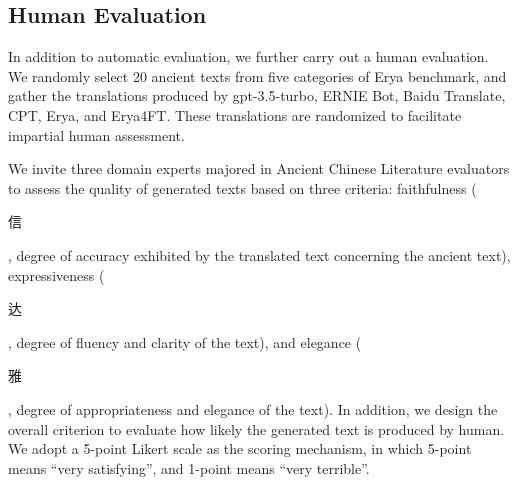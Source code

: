 


\subsection{Human Evaluation}
In addition to automatic evaluation, we further carry out a human evaluation. We randomly select 20 ancient texts from five categories of Erya benchmark, and gather the translations produced by gpt-3.5-turbo, ERNIE Bot, Baidu Translate, CPT, Erya, and Erya4FT. These translations are randomized to facilitate impartial human assessment.

We invite three domain experts majored in Ancient Chinese Literature evaluators to assess the quality of generated texts based on three criteria: faithfulness (\begin{CJK*}{UTF8}{gbsn}信\end{CJK*}, degree of accuracy exhibited by the translated text concerning the ancient text), expressiveness (\begin{CJK*}{UTF8}{gbsn}达\end{CJK*}, degree of fluency and clarity of the text), and elegance (\begin{CJK*}{UTF8}{gbsn}雅\end{CJK*}, degree of appropriateness and elegance of the text). In addition, we design the overall criterion to evaluate how likely the generated text is produced by human.
We adopt a 5-point Likert scale as the scoring mechanism, in which 5-point means ``very satisfying'', and 1-point means ``very terrible''.

